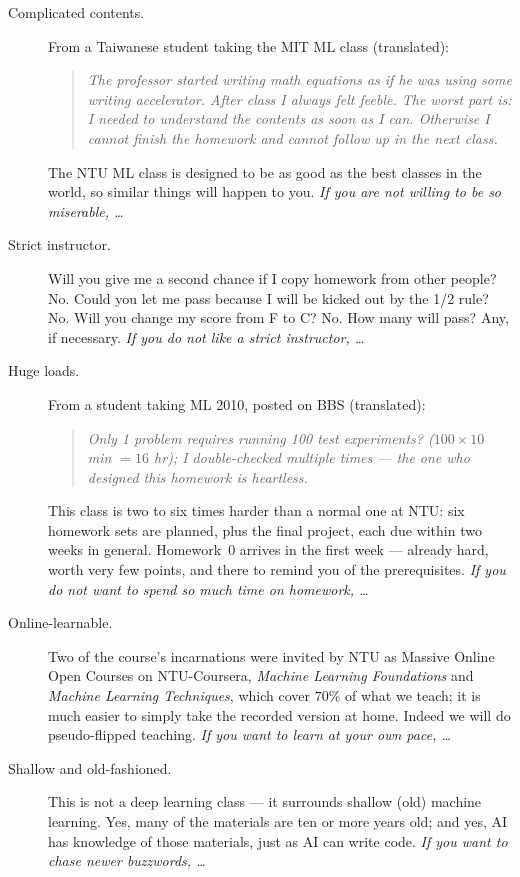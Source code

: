 \documentclass[a4paper,oneside]{scrbook}
\begin{document}
\begin{description}
    \item[Complicated contents.] From a Taiwanese student taking the MIT ML
        class (translated):
        \begin{quote}\itshape
            The professor started writing math equations as if he was using some
            writing accelerator. After class I always felt feeble. The worst part
            is: I needed to understand the contents as soon as I can. Otherwise I
            cannot finish the homework and cannot follow up in the next class.
        \end{quote}
        The NTU ML class is designed to be as good as the best classes in the
        world, so similar things will happen to you. \emph{If you are not willing
        to be so miserable, \ldots}

    \item[Strict instructor.] Will you give me a second chance if I copy homework
        from other people? No. Could you let me pass because I will be kicked out
        by the 1/2 rule? No. Will you change my score from F to C? No. How many
        will pass? Any, if necessary. \emph{If you do not like a strict
        instructor, \ldots}

    \item[Huge loads.] From a student taking ML 2010, posted on BBS
        (translated):
        \begin{quote}\itshape
            Only 1 problem requires running 100 test experiments?
            (\(100 \times 10\) min \(= 16\) hr); I double-checked multiple
            times --- the one who designed this homework is heartless.
        \end{quote}
        This class is two to six times harder than a normal one at NTU: six
        homework sets are planned, plus the final project, each due within two
        weeks in general. Homework~0 arrives in the first week --- already hard,
        worth very few points, and there to remind you of the prerequisites.
        \emph{If you do not want to spend so much time on homework, \ldots}

    \item[Online-learnable.] Two of the course's incarnations were invited by NTU
        as Massive Online Open Courses on NTU-Coursera, \emph{Machine Learning
        Foundations} and \emph{Machine Learning Techniques}, which cover
        \(70\%\) of what we teach; it is much easier to simply take the recorded
        version at home. Indeed we will do pseudo-flipped teaching. \emph{If you
        want to learn at your own pace, \ldots}

    \item[Shallow and old-fashioned.] This is not a deep learning class --- it
        surrounds shallow (old) machine learning. Yes, many of the materials are
        ten or more years old; and yes, AI has knowledge of those materials, just
        as AI can write code. \emph{If you want to chase newer buzzwords,
        \ldots}
\end{description}
\end{document}
